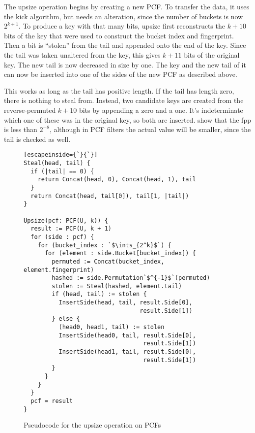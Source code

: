 \documentclass[letterpaper, 11pt]{article}
\newcommand{\ints}{\mathbb{Z}}
\begin{document}
The upsize operation begins by creating a new PCF.
To transfer the data, it uses the kick algorithm, but needs an alteration, since the number of buckets is now $2^{k+1}$.
To produce a key with that many bits, upsize first reconstructs the $k+10$ bits of the key that were used to construct the bucket index and fingerprint.
Then a bit is ``stolen'' from the tail and appended onto the end of the key.
Since the tail was taken unaltered from the key, this gives $k+11$ bits of the original key.
The new tail is now decreased in size by one.
The key and the new tail of it can now be inserted into one of the sides of the new PCF as described above.

This works as long as the tail has positive length.
If the tail has length zero, there is nothing to steal from.
Instead, two candidate keys are created from the reverse-permuted $k+10$ bits by appending a zero and a one.
It's indeterminate which one of these was in the original key, so both are inserted.
\cite{psw} show that the fpp is less than $2^{-8}$, although in PCF filters the actual value will be smaller, since the tail is checked as well.

\begin{figure}
\begin{lstlisting}[escapeinside={`}{`}]
Steal(head, tail) {
  if (|tail| == 0) {
    return Concat(head, 0), Concat(head, 1), tail
  }
  return Concat(head, tail[0]), tail[1, |tail|)
}

Upsize(pcf: PCF(U, k)) {
  result := PCF(U, k + 1)
  for (side : pcf) {
    for (bucket_index : `$\ints_{2^k}$`) {
      for (element : side.Bucket[bucket_index]) {
        permuted := Concat(bucket_index, element.fingerprint)
        hashed := side.Permutation`$^{-1}$`(permuted)
        stolen := Steal(hashed, element.tail)
        if (head, tail) := stolen {
          InsertSide(head, tail, result.Side[0],
                                 result.Side[1])
        } else {
          (head0, head1, tail) := stolen
          InsertSide(head0, tail, result.Side[0],
                                  result.Side[1])
          InsertSide(head1, tail, result.Side[0],
                                  result.Side[1])
        }
      }
    }
  }
  pcf = result
}
\end{lstlisting}
\caption{Pseudocode for the upsize operation on PCFs}
\end{figure}

\end{document}
